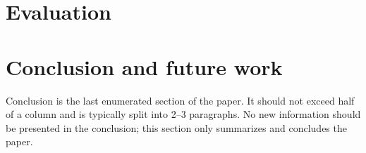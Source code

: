 \documentclass[10pt, a4paper]{article}
\begin{document}
\section{Evaluation}



\section{Conclusion and future work}

Conclusion is the last enumerated section of the paper. It should not exceed half of a column and is typically split into 2--3 paragraphs. No new information should be presented in the conclusion; this section only summarizes and concludes the paper.



 
\end{document}

